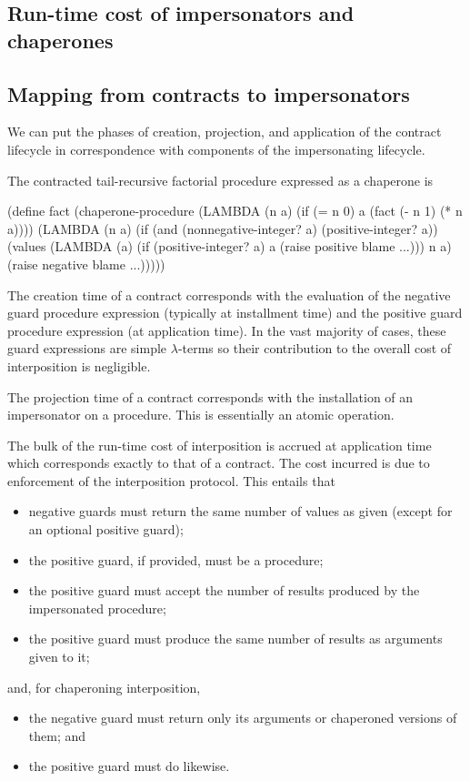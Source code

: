 \documentclass{sigplanconf}
\begin{document}
\subsection{Run-time cost of impersonators and chaperones}

\subsection{Mapping from contracts to impersonators}



We can put the phases of creation, projection, and application of the contract lifecycle in correspondence with components of the impersonating lifecycle.

The contracted tail-recursive factorial procedure expressed as a chaperone is
\begin{schemedisplay}
(define fact (chaperone-procedure
             (LAMBDA (n a)
               (if (= n 0)
                   a
                   (fact (- n 1) (* n a))))
             (LAMBDA (n a)
               (if (and (nonnegative-integer? a)
                        (positive-integer? a))
                   (values (LAMBDA (a)
                             (if (positive-integer? a)
                                 a
                                 (raise positive blame ...)))
                           n a)
                   (raise negative blame ...)))))
\end{schemedisplay}

The creation time of a contract corresponds with the evaluation of the negative guard procedure expression (typically at installment time) and the positive guard procedure expression (at application time).
In the vast majority of cases, these guard expressions are simple $\lambda$-terms so their contribution to the overall cost of interposition is negligible.

The projection time of a contract corresponds with the installation of an impersonator on a procedure.
This is essentially an atomic operation.

The bulk of the run-time cost of interposition is accrued at application time which corresponds exactly to that of a contract.
The cost incurred is due to enforcement of the interposition protocol.
This entails that
\begin{itemize}
\item negative guards must return the same number of values as given (except for an optional positive guard);
\item the positive guard, if provided, must be a procedure;
\item the positive guard must accept the number of results produced by the impersonated procedure;
\item the positive guard must produce the same number of results as arguments given to it;
\end{itemize}
and, for chaperoning interposition,
\begin{itemize}
\item the negative guard must return only its arguments or chaperoned versions of them; and
\item the positive guard must do likewise.
\end{itemize}
\end{document}
